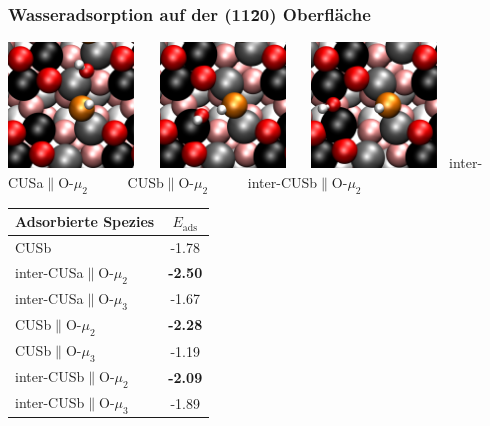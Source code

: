 \documentclass[hyperref={pdfpagelabels=false}]{beamer}
\begin{document}
\begin{frame}
 \frametitle{Wasseradsorption auf der (11\=20) Oberfläche}
 \centering
\includegraphics[width=0.25\textwidth]{figures/test-iCa2.pdf}~~~
\includegraphics[width=0.25\textwidth]{figures/test-Cb2.pdf}~~~
\includegraphics[width=0.25\textwidth]{figures/test-iCb2.pdf}~\newline
inter-CUSa$\parallel$O-$\mu_2$ ~~~~~CUSb$\parallel$O-$\mu_2$  ~~~~~inter-CUSb$\parallel$O-$\mu_2$~~~
\begin{table}[!ht]
  \centering
 \begin{tabular}{l|c}
  \toprule
   Adsorbierte Spezies  & $E_\textrm{ads}$  \\\midrule
 CUSb          &   -1.78   \\\hline
 inter-CUSa$\parallel$O-$\mu_2$ & \textbf{-2.50}  \\
 inter-CUSa$\parallel$O-$\mu_3$ & -1.67  \\
 CUSb$\parallel$O-$\mu_2$ & \textbf{-2.28}  \\
 CUSb$\parallel$O-$\mu_3$ & -1.19  \\
 inter-CUSb$\parallel$O-$\mu_2$ & \textbf{-2.09} \\
 inter-CUSb$\parallel$O-$\mu_3$ & -1.89 \\\bottomrule
  \end{tabular}
  \label{tab:ads_1water}
\end{table}

\end{frame}
\end{document}
